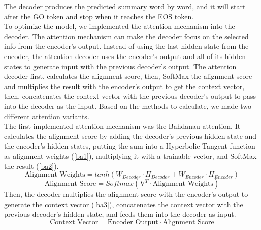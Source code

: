 \documentclass[conference]{IEEEtran}
\begin{document}
The decoder produces the predicted summary word by word, and it will start after the GO token and stop when it reaches the EOS token. \\
\indent To optimize the model, we implemented the attention mechanism into the decoder. The attention mechanism can make the decoder focus on the selected info from the encoder’s output. Instead of using the last hidden state from the encoder, the attention decoder uses the encoder’s output and all of its hidden states to generate input with the previous decoder’s output. The attention decoder first, calculates the alignment score, then, SoftMax the alignment score and multiplies the result with the encoder’s output to get the context vector, then, concatenates the context vector with the previous decoder’s output to pass into the decoder as the input. Based on the methods to calculate, we made two different attention variants. \\
\indent The first implemented attention mechanism was the Bahdanau attention. It calculates the alignment score by adding the decoder’s previous hidden state and the encoder’s hidden states, putting the sum into a Hyperbolic Tangent function as alignment weights (\ref{ba1}), multiplying it with a trainable vector, and SoftMax the result (\ref{ba2}).
\begin{dmath}
    \label{ba1}
    \text{Alignment Weights} = tanh(W_{Decoder} \cdot H_{Decoder} + W_{Encoder} \cdot H_{Encoder})
\end{dmath}  
\begin{equation}
    \label{ba2}
\text{Alignment Score} = Softmax(\mathrm{V}_{}^{T} \cdot \text{Alignment Weights})
\end{equation}  
 Then, the decoder multiplies the alignment score with the encoder’s output to generate the context vector (\ref{ba3}), concatenates the context vector with the previous decoder’s hidden state, and feeds them into the decoder as input.
\begin{dmath}
    \label{ba3}
\text{Context Vector} = \text{Encoder Output} \cdot \text{Alignment Score}
\end{dmath}  
\end{document}
